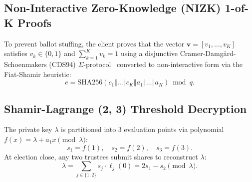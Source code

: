 \documentclass[journal,10pt,twocolumn]{IEEEtran}
\begin{document}
\subsection{Non-Interactive Zero-Knowledge (NIZK) 1-of-K Proofs}
To prevent ballot stuffing, the client proves that the vector $\mathbf{v} = [v_1, \dots, v_K]$ satisfies $v_k \in \{0, 1\}$ and $\sum_{k=1}^K v_k = 1$ using a disjunctive Cramer-Damg{\aa}rd-Schoenmakers (CDS94) $\Sigma$-protocol~\cite{cds1994proofs} converted to non-interactive form via the Fiat-Shamir heuristic:
\begin{equation}
e = \text{SHA256}(c_1 \mathbin{\Vert} \dots \mathbin{\Vert} c_K \mathbin{\Vert} a_1 \mathbin{\Vert} \dots \mathbin{\Vert} a_K) \bmod q.
\end{equation}

\subsection{Shamir-Lagrange (2, 3) Threshold Decryption}
The private key $\lambda$ is partitioned into 3 evaluation points via polynomial $f(x) = \lambda + a_1 x \pmod{\lambda}$:
\begin{equation}
s_1 = f(1), \quad s_2 = f(2), \quad s_3 = f(3).
\end{equation}
At election close, any two trustees submit shares to reconstruct $\lambda$:
\begin{equation}
\lambda = \sum_{j \in \{1, 2\}} s_j \cdot \ell_j(0) = 2s_1 - s_2 \pmod{\lambda}.
\end{equation}
\end{document}
